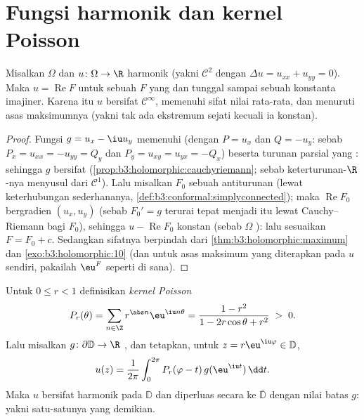 \section{Fungsi harmonik dan kernel Poisson}

\begin{proposition}\label{prop:b3:conformal:harmonicholo}
Misalkan $\Omega$  dan $u \colon \Omega \to \R$
harmonik (yakni $\mathcal C^2$ dengan
$\Delta u = u_{xx} + u_{yy} = 0$). Maka $u =
\operatorname{Re}F$ untuk sebuah $F$ yang  dan tunggal sampai sebuah
konstanta imajiner. Karena itu $u$ bersifat $\mathcal C^\infty$,
memenuhi sifat nilai rata-rata, dan menuruti asas
maksimumnya (yakni tak ada ekstremum  sejati kecuali ia konstan).
\end{proposition}

\begin{proof}
Fungsi $g = u_x - \iu u_y$ memenuhi 
(dengan $P = u_x$ dan $Q = -u_y$: sebab $P_x = u_{xx} = -u_{yy} = Q_y$ dan
$P_y = u_{xy} = u_{yx} = -Q_x$) beserta turunan parsial yang : sehingga $g$
bersifat  (\cref{prop:b3:holomorphic:cauchyriemann}; sebab
keterturunan-$\R$-nya menyusul dari $\mathcal C^1$). Lalu misalkan $F_0$
sebuah antiturunan (lewat keterhubungan sederhananya,
\cref{def:b3:conformal:simplyconnected}); maka
$\operatorname{Re}F_0$ bergradien $(u_x, u_y)$
(sebab $F_0' = g$ terurai tepat menjadi itu lewat Cauchy--Riemann bagi
$F_0$), sehingga $u - \operatorname{Re}F_0$ konstan (sebab $\Omega$
): lalu sesuaikan $F = F_0 + c$. Sedangkan sifatnya berpindah
dari \cref{thm:b3:holomorphic:maximum} dan
\cref{exo:b3:holomorphic:10} (dan untuk asas maksimum yang
diterapkan pada $u$ sendiri, pakailah $\eu^{F}$ seperti di sana).
\end{proof}

\begin{theorem}\label{thm:b3:conformal:poisson}
Untuk $0 \leq r < 1$ definisikan \emph{kernel
Poisson}
\[
P_r(\theta) = \sum_{n\in\Z}r^{\abs n}\eu^{\iu n\theta}
= \frac{1 - r^2}{1 - 2r\cos\theta + r^2} \;>\; 0 .
\]
Lalu misalkan $g \colon \partial\mathbb D \to \R$ , dan
tetapkan, untuk $z = r\eu^{\iu\varphi} \in \mathbb D$,
\[
u(z) = \frac1{2\pi}\int_0^{2\pi}
P_r(\varphi - t)\,g(\eu^{\iu t})\,\dd t .
\]
Maka $u$ bersifat harmonik pada $\mathbb D$ dan diperluas secara 
ke $\bar{\mathbb D}$ dengan nilai batas $g$: yakni satu-satunya
 yang demikian.
\end{theorem}

